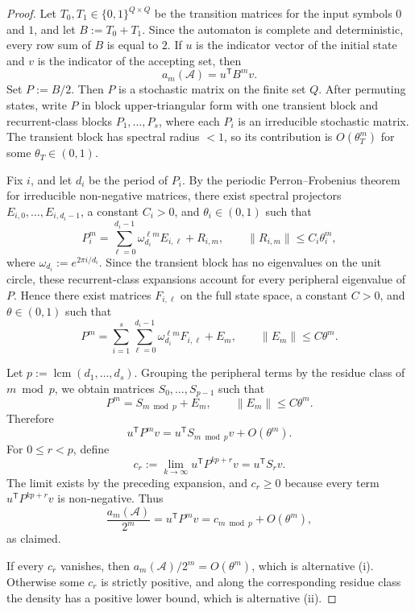 \begin{proof}
  Let \(T_0,T_1\in\{0,1\}^{Q\times Q}\) be the transition matrices for
  the input symbols \(0\) and \(1\), and let \(B:=T_0+T_1\). Since the
  automaton is complete and deterministic, every row sum of \(B\) is
  equal to \(2\). If \(u\) is the indicator vector of the initial state
  and \(v\) is the indicator of the accepting set, then
  \[
    a_m(\mathcal A)=u^{\mathsf T}B^m v.
  \]
  Set \(P:=B/2\). Then \(P\) is a stochastic matrix on the finite set
  \(Q\). After permuting states, write \(P\) in block upper-triangular
  form with one transient block and recurrent-class blocks
  \(P_1,\dots,P_s\), where each \(P_i\) is an irreducible stochastic
  matrix. The transient block has spectral radius \(<1\), so its
  contribution is \(O(\theta_T^m)\) for some \(\theta_T\in(0,1)\).

  Fix \(i\), and let \(d_i\) be the period of \(P_i\). By the periodic
  Perron--Frobenius theorem for irreducible non-negative matrices, there
  exist spectral projectors \(E_{i,0},\dots,E_{i,d_i-1}\), a constant
  \(C_i>0\), and \(\theta_i\in(0,1)\) such that
  \[
    P_i^m
    =\sum_{\ell=0}^{d_i-1}\omega_{d_i}^{\ell m}E_{i,\ell}+R_{i,m},
    \qquad
    \|R_{i,m}\|\le C_i\theta_i^m,
  \]
  where \(\omega_{d_i}:=e^{2\pi i/d_i}\). Since the transient block has
  no eigenvalues on the unit circle, these recurrent-class expansions
  account for every peripheral eigenvalue of \(P\). Hence there exist
  matrices \(F_{i,\ell}\) on the full state space, a constant \(C>0\),
  and \(\theta\in(0,1)\) such that
  \[
    P^m
    =\sum_{i=1}^s\sum_{\ell=0}^{d_i-1}
      \omega_{d_i}^{\ell m}F_{i,\ell}+E_m,
    \qquad
    \|E_m\|\le C\theta^m.
  \]

  Let \(p:=\operatorname{lcm}(d_1,\dots,d_s)\). Grouping the peripheral
  terms by the residue class of \(m\bmod p\), we obtain matrices
  \(S_0,\dots,S_{p-1}\) such that
  \[
    P^m=S_{m\bmod p}+E_m,
    \qquad
    \|E_m\|\le C\theta^m.
  \]
  Therefore
  \[
    u^{\mathsf T}P^m v=u^{\mathsf T}S_{m\bmod p}v+O(\theta^m).
  \]
  For \(0\le r<p\), define
  \[
    c_r:=\lim_{k\to\infty}u^{\mathsf T}P^{kp+r}v=u^{\mathsf T}S_r v.
  \]
  The limit exists by the preceding expansion, and \(c_r\ge 0\) because
  every term \(u^{\mathsf T}P^{kp+r}v\) is non-negative. Thus
  \[
    \frac{a_m(\mathcal A)}{2^m}
    =u^{\mathsf T}P^m v
    =c_{m\bmod p}+O(\theta^m),
  \]
  as claimed.

  If every \(c_r\) vanishes, then
  \(a_m(\mathcal A)/2^m=O(\theta^m)\), which is alternative
  \textup{(i)}. Otherwise some \(c_r\) is strictly positive, and along
  the corresponding residue class the density has a positive lower
  bound, which is alternative \textup{(ii)}.
\end{proof}

